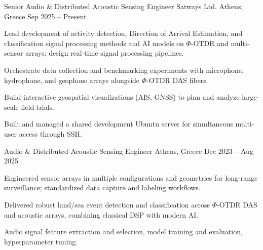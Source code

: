 

\begin{cventries}

  \cventry
    {Senior Audio \& Distributed Acoustic Sensing Engineer} %
    {Satways Ltd.} %
    {Athens, Greece} %
    {Sep 2025 -- Present} %
    {
      \begin{cvitems}
        \item {Lead development of activity detection, Direction of Arrival Estimation, and classification signal processing methods and AI models on $\Phi$-OTDR and multi-sensor arrays; design real-time signal processing pipelines.}
        \item {Orchestrate data collection and benchmarking experiments with microphone, hydrophone, and geophone arrays alongside $\Phi$-OTDR DAS fibers.}
        \item {Build interactive geospatial visualizations (AIS, GNSS) to plan and analyze large-scale field trials.}
        \item {Built and managed a shared development Ubuntu server for simultaneous multi-user access through SSH.}
      \end{cvitems}
    }

  \vspace{-5mm}
  \cventry
    {Audio \& Distributed Acoustic Sensing Engineer} %
    {} %
    {Athens, Greece} %
    {Dec 2023 -- Aug 2025} %
    {
      \begin{cvitems}
        \item {Engineered sensor arrays in multiple configurations and geometries for long-range surveillance; standardized data capture and labeling workflows.}
        \item {Delivered robust land/sea event detection and classification across $\Phi$-OTDR DAS and acoustic arrays, combining classical DSP with modern AI.}
        \item {Audio signal feature extraction and selection, model training and evaluation, hyperparameter tuning.}
      \end{cvitems}
    }


\end{cventries}
